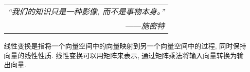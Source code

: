 \begin{flushright}
    \begin{tabular}{r||}
        \textit{“我们的知识只是一种影像, 而不是事物本身。”}\\
        ——\textit{施密特}
    \end{tabular}
\end{flushright}

线性变换是指将一个向量空间中的向量映射到另一个向量空间中的过程, 同时保持向量的线性性质. 线性变换可以用矩阵来表示, 通过矩阵乘法将输入向量转换为输出向量. 